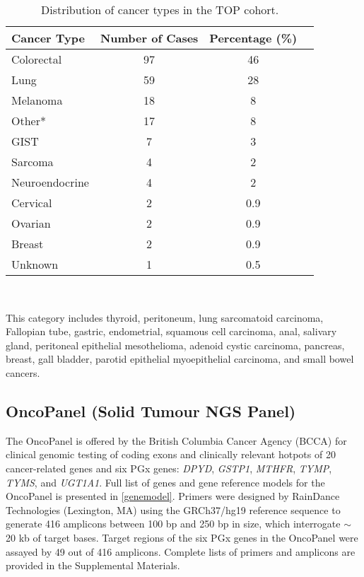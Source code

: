 \documentclass{bmcart}
\begin{document}
\begin{table}[H]
\caption{Distribution of cancer types in the TOP cohort.}\label{cancertypes}
      \begin{tabular}{lccc}
        \hline
        Cancer Type & Number of Cases & Percentage (\%) \\ \hline
        Colorectal & 97 & 46 \\
        Lung & 59 & 28 \\
        Melanoma & 18 & 8 \\
				Other* & 17 & 8 \\
				GIST & 7 & 3 \\
				Sarcoma & 4 & 2 \\
				Neuroendocrine & 4 & 2 \\
				Cervical & 2 & 0.9 \\
				Ovarian & 2 & 0.9 \\
				Breast & 2 & 0.9 \\
				Unknown & 1 & 0.5 \\ \hline
      \end{tabular} \\
\raggedright
{\small *This category includes thyroid, peritoneum, lung sarcomatoid carcinoma, Fallopian tube, gastric, endometrial, squamous cell carcinoma, anal, salivary gland, peritoneal epithelial mesothelioma, adenoid cystic carcinoma, pancreas, breast, gall bladder, parotid epithelial myoepithelial carcinoma, and small bowel cancers.}
\end{table}

\subsection*{OncoPanel (Solid Tumour NGS Panel)}
The OncoPanel is offered by the British Columbia Cancer Agency (BCCA) for clinical genomic testing of coding exons and clinically relevant hotpots of 20 cancer-related genes and six PGx genes: \textit{DPYD}, \textit{GSTP1}, \textit{MTHFR}, \textit{TYMP}, \textit{TYMS}, and \textit{UGT1A1}. Full list of genes and gene reference models for the OncoPanel is presented in \autoref{genemodel}. Primers were designed by RainDance Technologies (Lexington, MA) using the GRCh37/hg19 reference sequence to generate 416 amplicons between 100 bp and 250 bp in size, which interrogate $\sim$ 20 kb of target bases. Target regions of the six PGx genes in the OncoPanel were assayed by 49 out of 416 amplicons. Complete lists of primers and amplicons are provided in the Supplemental Materials.
\end{document}
